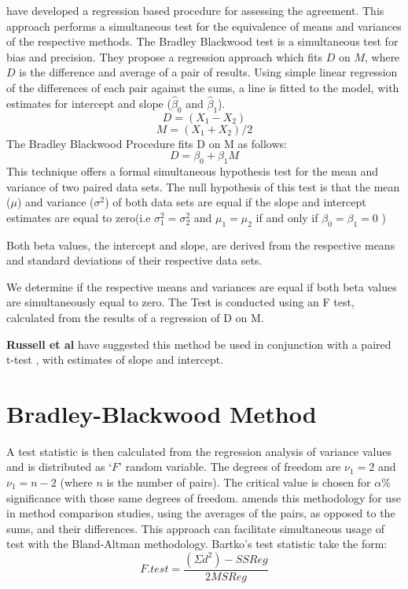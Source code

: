 \documentclass[12pt, a4paper]{report}
\theoremstyle{plain}
\theoremstyle{definition}
\theoremstyle{remark}
\begin{document}
	
	\citet{BB89} have developed a regression based procedure for
	assessing the agreement. This approach performs a simultaneous test for the equivalence of
	means and variances of the respective methods. The Bradley Blackwood test is a simultaneous test for bias and
	precision. They propose a regression approach which fits $D$ on $M$,
	where $D$ is the difference and average of a pair of results. Using simple linear
	regression of the differences of each pair against the sums, a
	line is fitted to the model, with estimates for intercept and
	slope ($\hat{\beta}_{0}$ and $\hat{\beta}_{1}$).
	\begin{equation}
	D = (X_{1}-X_{2})
	\end{equation}
	\begin{equation}
	M = (X_{1} + X_{2}) /2
	\end{equation}
	The Bradley Blackwood Procedure fits D on M as follows:\\
	\begin{equation}
	D = \beta_{0} + \beta_{1}M
	\end{equation}
	This technique offers a formal simultaneous hypothesis test for the
	mean and variance of two paired data sets.  The null
	hypothesis of this test is that the mean ($\mu$) and variance
	($\sigma^{2}$) of both data sets are equal if the slope and
	intercept estimates are equal to zero(i.e $\sigma^{2}_{1} =
	\sigma^{2}_{2}$ and $\mu_{1}=\mu_{2}$ if and only if $\beta_{0}=
	\beta_{1}=0$ )
	
	Both beta values, the intercept and slope, are derived from the respective means and
	standard deviations of their respective data sets.
	
	We determine if the respective means and variances are equal if
	both beta values are simultaneously equal to zero. The Test is
	conducted using an F test, calculated from the results of a
	regression of D on M.
	
	
	\textbf{Russell et al} have suggested this method be used in conjunction with a paired t-test , with estimates of slope and intercept.
	
	\section{Bradley-Blackwood Method}
	
	
	A test statistic is then calculated from the regression analysis
	of variance values \citep{BB89} and is distributed as `$F$' random
	variable. The degrees of freedom are $\nu_{1}=2$ and $\nu_{1}=n-2$
	(where $n$ is the number of pairs). The critical value is chosen
	for $\alpha\%$ significance with those same degrees of freedom.
	\citet{Bartko} amends this methodology for use in method
	comparison studies, using the averages of the pairs, as opposed to
	the sums, and their differences. This approach can facilitate
	simultaneous usage of test with the Bland-Altman methodology.
	Bartko's test statistic take the form:
	\[ F.test = \frac{(\Sigma d^{2})-SSReg}{2MSReg}
	\]
\end{document}
